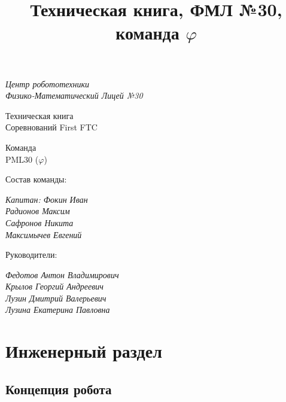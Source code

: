 \documentclass[11pt]{article}
\title{ Техническая книга, ФМЛ №30, команда ${\varphi}$}
\begin{document}
\thispagestyle{titlestyle}
   \begin{titlepage}
      \newpage

      \begin{center}
         \LARGE\textit{Центр робототехники \\ Физико-Математический Лицей №30}

         \vspace{8em}

         \LARGE{Техническая книга \\ Соревнований First FTC}

         \vspace{4em}

         Команда \\ PML30 (${\varphi}$)

      \end{center}
   \end{titlepage}

   \newpage
   \large Состав команды:

   \begin{flushleft}
      \emph{Капитан: Фокин Иван} \\
      \emph{Радионов Максим} \\
      \emph{Сафронов Никита} \\
      \emph{Максимычев Евгений}
   \end{flushleft}

   \large Руководители:

   \begin{flushleft}
      \emph{Федотов Антон Владимирович} \\
      \emph{Крылов Георгий Андреевич} \\
      \emph{Лузин Дмитрий Валерьевич} \\
      \emph{Лузина Екатерина Павловна}
   \end{flushleft}   

   \newpage
   \tableofcontents{}

   \newpage

   \section{Инженерный раздел}
   \subsection{Концепция робота}
\end{document}

